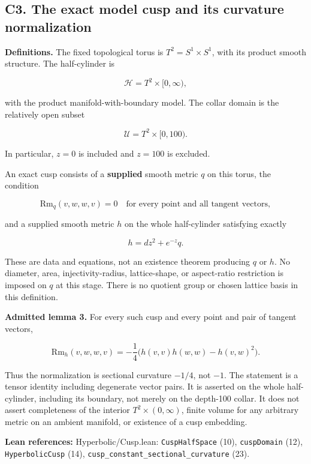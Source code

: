 \documentclass[
  letterpaper,
  11pt]{article}
\begin{document}
\subsection{C3. The exact model cusp and its curvature
normalization}\label{collapse-cuspmodel}

\textbf{Definitions.} The fixed topological torus is
\(T^2=S^1\times S^1\), with its product smooth structure. The
half-cylinder is

\[
 \mathcal H=T^2\times[0,\infty),
\]

with the product manifold-with-boundary model. The collar domain is the
relatively open subset

\[
 \mathcal U=T^2\times[0,100).
\]

In particular, \(z=0\) is included and \(z=100\) is excluded.

An exact cusp consists of a \textbf{supplied} smooth metric \(q\) on
this torus, the condition

\[
 \mathrm{Rm}_q(v,w,w,v)=0\quad\text{for every point and all tangent vectors},
\]

and a supplied smooth metric \(h\) on the whole half-cylinder satisfying
exactly

\[
 h=dz^2+e^{-z}q.
\]

These are data and equations, not an existence theorem producing \(q\)
or \(h\). No diameter, area, injectivity-radius, lattice-shape, or
aspect-ratio restriction is imposed on \(q\) at this stage. There is no
quotient group or chosen lattice basis in this definition.

\textbf{Admitted lemma 3.} For every such cusp and every point and pair
of tangent vectors,

\[
 \mathrm{Rm}_h(v,w,w,v)
 =-\frac14\bigl(h(v,v)h(w,w)-h(v,w)^2\bigr).
\]

Thus the normalization is sectional curvature \(-1/4\), not \(-1\). The
statement is a tensor identity including degenerate vector pairs. It is
asserted on the whole half-cylinder, including its boundary, not merely
on the depth-100 collar. It does not assert completeness of the interior
\(T^2\times(0,\infty)\), finite volume for any arbitrary metric on an
ambient manifold, or existence of a cusp embedding.

\textbf{Lean references:} Hyperbolic/Cusp.lean:
{\small\texttt{Cusp\allowbreak{}Half\allowbreak{}Space}} (10),
{\small\texttt{cusp\allowbreak{}Domain}} (12),
{\small\texttt{Hyperbolic\allowbreak{}Cusp}} (14),
{\small\texttt{cusp\_\allowbreak{}constant\_\allowbreak{}sectional\_\allowbreak{}curvature}}
(23).
\end{document}
